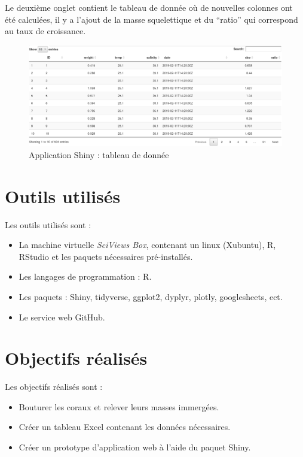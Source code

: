 \documentclass[]{report}
\begin{document}
Le deuxième onglet contient le tableau de donnée où de nouvelles
colonnes ont été calculées, il y a l'ajout de la masse squelettique et
du ``ratio'' qui correspond au taux de croissance.

\begin{figure}[h!]
\includegraphics[]{../image/shiny8.PNG}
\caption{Application Shiny : tableau de donnée}
\end{figure}

\section{Outils utilisés}\label{outils-utilises}

Les outils utilisés sont :

\begin{itemize}
\item
  La machine virtuelle \emph{SciViews Box}, contenant un linux
  (Xubuntu), R, RStudio et les paquets nécessaires pré-installés.
\item
  Les langages de programmation : R.
\item
  Les paquets : Shiny, tidyverse, ggplot2, dyplyr, plotly, googlesheets,
  ect.
\item
  Le service web GitHub.
\end{itemize}

\section{Objectifs réalisés}\label{objectifs-realises}

Les objectifs réalisés sont :

\begin{itemize}
\item
  Bouturer les coraux et relever leurs masses immergées.
\item
  Créer un tableau Excel contenant les données nécessaires.
\item
  Créer un prototype d'application web à l'aide du paquet Shiny.
\end{itemize}
\end{document}
